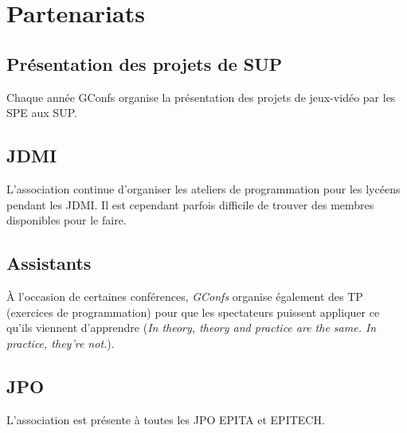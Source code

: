 \documentclass[a4paper]{article}
\begin{document}
\section{Partenariats}

\subsection{Présentation des projets de SUP}

Chaque année GConfs organise la présentation des projets de jeux-vidéo par les
SPE aux SUP.

\subsection{JDMI}

L'association continue d'organiser les ateliers de programmation pour les
lycéens pendant les JDMI. Il est cependant parfois difficile de trouver des
membres disponibles pour le faire.

\subsection{Assistants}

À l'occasion de certaines conférences, \emph{GConfs} organise également des TP
(exercices de programmation) pour que les spectateurs puissent appliquer ce
qu'ils viennent d'apprendre (\emph{In theory, theory and practice are the same.
In practice, they’re not.}).

\subsection{JPO}

L'association est présente à toutes les JPO EPITA et EPITECH.


\end{document}

